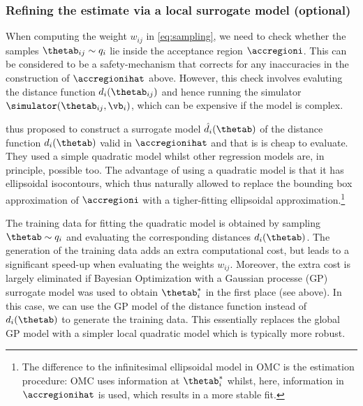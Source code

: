 \subsubsection*{Refining the estimate via a local surrogate model (optional)}
When computing the weight $w_{ij}$ in \eqref{eq:sampling}, we need to
check whether the samples $\thetab_{ij} \sim q_i$ lie inside the
acceptance region $\accregioni$. This can be considered to be a
safety-mechanism that corrects for any inaccuracies in the
construction of $\accregionihat$ above. However, this check involves
evaluting the distance function $d_i(\thetab_{ij})$ and hence running
the simulator $\simulator(\thetab_{ij}, \vb_i)$, which can be
expensive if the model is complex.

\citet{Ikonomov2019} thus proposed to construct a surrogate model $\hat{d}_i(\thetab)$
of the distance function $d_i(\thetab)$ valid in $\accregionihat$ and
that is is cheap to evaluate. They used a simple quadratic model
whilst other regression models are, in principle, possible too. The
advantage of using a quadratic model is that it has ellipsoidal
isocontours, which thus naturally allowed \citet{Ikonomov2019} to
replace the bounding box approximation of $\accregioni$ with a
tigher-fitting ellipsoidal approximation.\footnote{The difference to
the infinitesimal ellipsoidal model in OMC is the estimation procedure: OMC uses
information at $\thetab_i^*$ whilst, here, information in
$\accregionihat$ is used, which results in a more stable fit.}

The training data for fitting the quadratic model is obtained by
sampling $\thetab \sim q_i$ and evaluating the corresponding distances
$d_i(\thetab)$. The generation of the training data adds an extra
computational cost, but leads to a significant speed-up when
evaluating the weights $w_{ij}$. Moreover, the extra cost is largely
eliminated if Bayesian Optimization with a Gaussian processe (GP)
surrogate model was used to obtain $\thetab_i^*$ in the first place
(see above). In this case, we can use the GP model of the distance
function instead of $d_i(\thetab)$ to generate the training data. This
essentially replaces the global GP model with a simpler local
quadratic model which is typically more robust.



